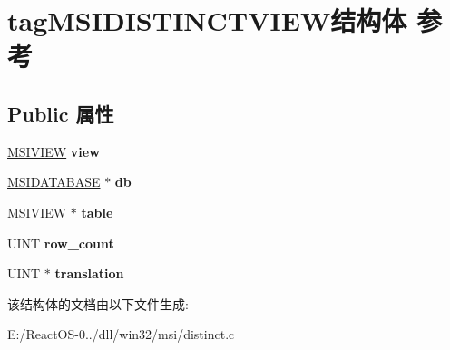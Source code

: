 \hypertarget{structtag_m_s_i_d_i_s_t_i_n_c_t_v_i_e_w}{}\section{tag\+M\+S\+I\+D\+I\+S\+T\+I\+N\+C\+T\+V\+I\+E\+W结构体 参考}
\label{structtag_m_s_i_d_i_s_t_i_n_c_t_v_i_e_w}
\subsection*{Public 属性}
\begin{DoxyCompactItemize}
\item 
\mbox{\label{structtag_m_s_i_d_i_s_t_i_n_c_t_v_i_e_w_a2b2ccf0cd217f641b530c80c9da805eb}} 
\hyperlink{structtag_m_s_i_v_i_e_w}{M\+S\+I\+V\+I\+EW} {\bfseries view}
\item 
\mbox{\label{structtag_m_s_i_d_i_s_t_i_n_c_t_v_i_e_w_af31ba4d655e60ff638900c334e995f38}} 
\hyperlink{structtag_m_s_i_d_a_t_a_b_a_s_e}{M\+S\+I\+D\+A\+T\+A\+B\+A\+SE} $\ast$ {\bfseries db}
\item 
\mbox{\label{structtag_m_s_i_d_i_s_t_i_n_c_t_v_i_e_w_a733e67261004e5dd4447cf298c56996f}} 
\hyperlink{structtag_m_s_i_v_i_e_w}{M\+S\+I\+V\+I\+EW} $\ast$ {\bfseries table}
\item 
\mbox{\label{structtag_m_s_i_d_i_s_t_i_n_c_t_v_i_e_w_a576b90ef50b3a349a32351a034aae676}} 
U\+I\+NT {\bfseries row\+\_\+count}
\item 
\mbox{\label{structtag_m_s_i_d_i_s_t_i_n_c_t_v_i_e_w_a846ef91e274a6aaa93c605ff0918da25}} 
U\+I\+NT $\ast$ {\bfseries translation}
\end{DoxyCompactItemize}


该结构体的文档由以下文件生成\+:\begin{DoxyCompactItemize}
\item 
E\+:/\+React\+O\+S-\/0../dll/win32/msi/distinct.\+c\end{DoxyCompactItemize}
